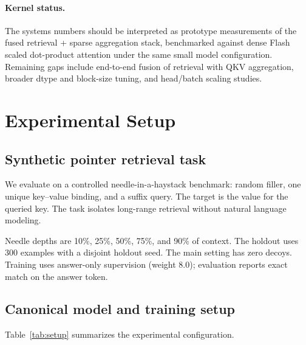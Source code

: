 \documentclass{article}
\begin{document}
\paragraph{Kernel status.}
The systems numbers should be interpreted as prototype measurements of the fused retrieval + sparse aggregation stack, benchmarked against dense Flash scaled dot-product attention under the same small model configuration. Remaining gaps include end-to-end fusion of retrieval with QKV aggregation, broader dtype and block-size tuning, and head/batch scaling studies.

\section{Experimental Setup}

\subsection{Synthetic pointer retrieval task}

We evaluate on a controlled needle-in-a-haystack benchmark: random filler, one unique key--value binding, and a suffix query. The target is the value for the queried key. The task isolates long-range retrieval without natural language modeling.

Needle depths are 10\%, 25\%, 50\%, 75\%, and 90\% of context. The holdout uses 300 examples with a disjoint holdout seed. The main setting has zero decoys. Training uses answer-only supervision (weight 8.0); evaluation reports exact match on the answer token.

\subsection{Canonical model and training setup}

Table~\ref{tab:setup} summarizes the experimental configuration.
\end{document}
